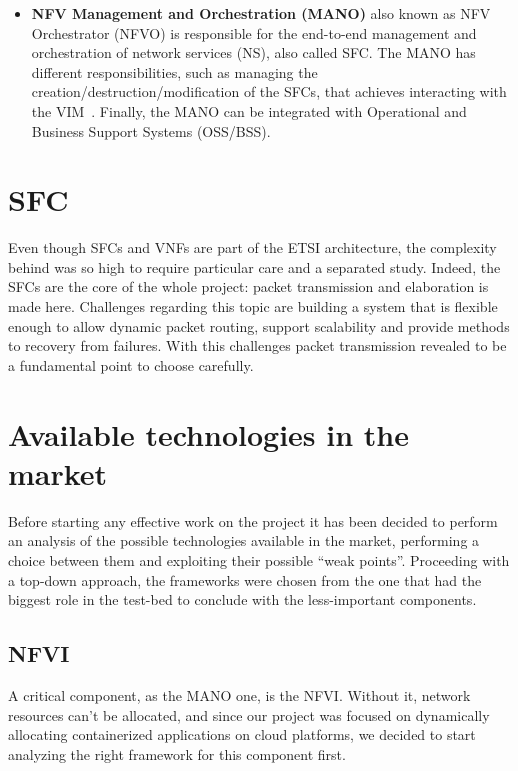 \begin{itemize}
\item \textbf{NFV Management and Orchestration (MANO)} also known as NFV
  Orchestrator (NFVO) is responsible for the end-to-end management and
  orchestration of network services (NS), also called SFC. The MANO has
  different responsibilities, such as managing the
  creation/destruction/modification of the SFCs, that achieves interacting with
  the VIM~\cite{nguyen2017sdn}. Finally, the MANO can be integrated with
  Operational and Business Support Systems (OSS/BSS).
\end{itemize}


\section{SFC}
\label{chap:prjan:sfc}


Even though SFCs and VNFs are part of the ETSI architecture, the complexity 
behind was so high to require particular care and a separated study. Indeed, 
the  SFCs are the core of the whole project: packet transmission and 
elaboration is made here. Challenges regarding this topic are building a 
system that is flexible enough to allow dynamic packet routing, support 
scalability and provide methods to recovery from failures. With this challenges 
packet transmission revealed to be a fundamental point to choose carefully.

\section{Available technologies in the market} 
\label{chap:prjan:sec:tech}

Before starting any effective work on the project it has been decided to 
perform an analysis of the possible technologies available in the market, 
performing a choice between them and exploiting their possible ``weak 
points''. Proceeding with a top-down approach, the frameworks were chosen from 
the one that had the biggest role in the test-bed to conclude with the 
less-important components.

\subsection{NFVI}

A critical component, as the MANO one, is the NFVI. Without it, network 
resources can't be allocated, and since our project was focused on dynamically 
allocating containerized applications on cloud platforms, we decided to start 
analyzing the right framework for this component first.

